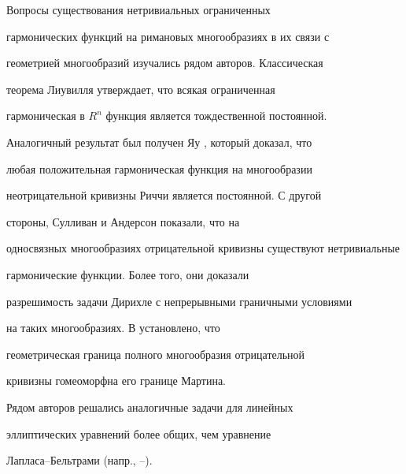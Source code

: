  


\date{} 




\pagestyle{plain} %


 




\maketitle 


\label{begin} 





Вопросы существования нетривиальных ограниченных


гармонических функций на римановых многообразиях в их связи с


геометрией многообразий изучались рядом авторов. Классическая


теорема Лиувилля утверждает, что всякая ограниченная


гармоническая в $R^n$ функция является тождественной постоянной.


Аналогичный результат был получен Яу \cite{Yau}, который доказал, что


любая положительная гармоническая функция на многообразии


неотрицательной кривизны Риччи является постоянной. С другой


стороны, Сулливан \cite{Sul} и Андерсон \cite{And1} показали, что на


односвязных многообразиях отрицательной кривизны существуют нетривиальные


гармонические функции. Более того, они доказали


разрешимость задачи Дирихле с непрерывными граничными условиями


на таких многообразиях. В \cite{And2} установлено, что


геометрическая граница полного многообразия отрицательной


кривизны гомеоморфна его границе Мартина.


Рядом авторов решались аналогичные задачи для линейных


эллиптических уравнений более общих, чем уравнение


Лапласа--Бельтрами (напр., \cite{Mur}--\cite{Gri}).





